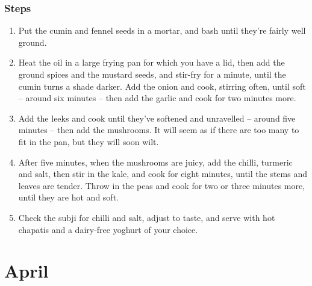 \documentclass{book}
\begin{document}
\subsection*{Steps}
\begin{enumerate}
\item Put the cumin and fennel seeds in a mortar, and bash until they’re fairly well ground.
\item Heat the oil in a large frying pan for which you have a lid, then add the ground spices and the mustard seeds, and stir-fry for a minute, until the cumin turns a shade darker. Add the onion and cook, stirring often, until soft – around six minutes – then add the garlic and cook for two minutes more.
\item Add the leeks and cook until they’ve softened and unravelled – around five minutes – then add the mushrooms. It will seem as if there are too many to fit in the pan, but they will soon wilt.
\item After five minutes, when the mushrooms are juicy, add the chilli, turmeric and salt, then stir in the kale, and cook for eight minutes, until the stems and leaves are tender. Throw in the peas and cook for two or three minutes more, until they are hot and soft.
\item Check the subji for chilli and salt, adjust to taste, and serve with hot chapatis and a dairy-free yoghurt of your choice.
\end{enumerate}
\newpage

\chapter{April}
\end{document}
